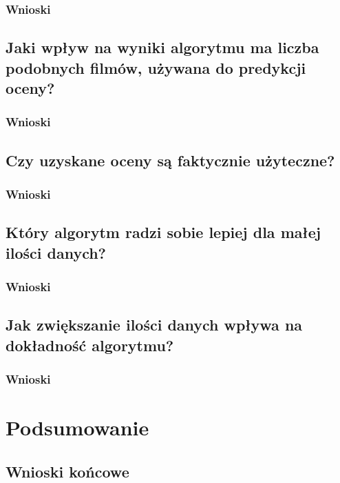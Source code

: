 \documentclass[12pt, a4paper]{article}
\begin{document}
\subsubsection{Wnioski}

\subsection{Jaki wpływ na wyniki algorytmu ma liczba podobnych filmów, używana do predykcji oceny?}

\subsubsection{Wnioski}

\subsection{Czy uzyskane oceny są faktycznie użyteczne?}

\subsubsection{Wnioski}

\subsection{Który algorytm radzi sobie lepiej dla małej ilości danych?}

\subsubsection{Wnioski}

\subsection{Jak zwiększanie ilości danych wpływa na dokładność algorytmu?}

\subsubsection{Wnioski}

\section{Podsumowanie}

\subsection{Wnioski końcowe}

\nocite{*}


\end{document}
